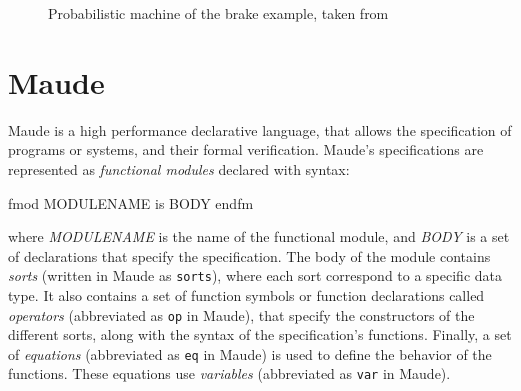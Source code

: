 \begin{example}
\begin{figure}[h]
    \quad
    \caption{Probabilistic machine of the brake example, taken from \cite{Aouadhi2017}}
    \label{fig:brake3}
\end{figure}


\end{example}


\section{Maude}

Maude \cite{MaudeManual, PeterMaude, Lecture1} is a high performance declarative language, that allows the specification of programs or systems, and their formal verification.
Maude's specifications are represented as \textit{functional modules} declared with syntax: \\
\begin{maude}
fmod MODULENAME is
    BODY
endfm
\end{maude}
where \textit{MODULENAME} is the name of the functional module, and \textit{BODY} is a set of declarations that specify the specification. The body of the module contains \textit{sorts} (written in Maude as \texttt{sorts}), where each sort correspond to a specific data type. It also contains a set of function symbols or function declarations called \textit{operators} (abbreviated as \texttt{op} in Maude), that specify the constructors of the different sorts, along with the syntax of the specification's functions. Finally, a set of \textit{equations} (abbreviated as \texttt{eq} in Maude) is used to define the behavior of the functions. These equations use \textit{variables} (abbreviated as \texttt{var} in Maude). 

